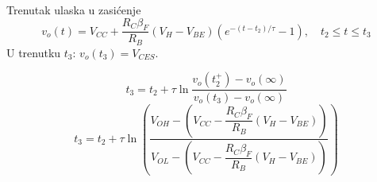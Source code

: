 \begin{frame}[label=10-s031]{Trenutak ulaska u zasićenje}
\setlength{\abovedisplayskip}{4pt}\setlength{\belowdisplayskip}{4pt}\setlength{\abovedisplayshortskip}{3pt}\setlength{\belowdisplayshortskip}{3pt}
\[v_o(t)=V_{CC}+\frac{R_C\beta_F}{R_B}(V_H-V_{BE})(e^{-(t-t_2)/\tau}-1),\quad t_2\leq t\leq t_3\]
U trenutku $t_3$: $v_o(t_3)=V_{CES}$.\par\medskip
\[t_3=t_2+\tau\ln\frac{v_o(t_2^+)-v_o(\infty)}{v_o(t_3)-v_o(\infty)}\]
\[t_3=t_2+\tau\ln\left(\frac{V_{OH}-(V_{CC}-\dfrac{R_C\beta_F}{R_B}(V_H-V_{BE}))}{V_{OL}-(V_{CC}-\dfrac{R_C\beta_F}{R_B}(V_H-V_{BE}))}\right)\]
\end{frame}

